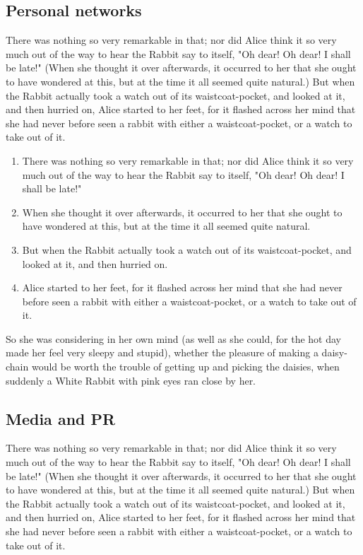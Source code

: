 \documentclass[12pt]{article}
\begin{document}
\subsection{Personal networks}
\label{sec:orgheadline27}
There was nothing so very remarkable in that; nor did Alice think it so very much out of the way to hear the Rabbit say to itself, "Oh dear! Oh dear! I shall be late!" (When she thought it over afterwards, it occurred to her that she ought to have wondered at this, but at the time it all seemed quite natural.) But when the Rabbit actually took a watch out of its waistcoat-pocket, and looked at it, and then hurried on, Alice started to her feet, for it flashed across her mind that she had never before seen a rabbit with either a waistcoat-pocket, or a watch to take out of it. 

\begin{enumerate}
\item There was nothing so very remarkable in that; nor did Alice think it so very much out of the way to hear the Rabbit say to itself, "Oh dear! Oh dear! I shall be late!"
\item When she thought it over afterwards, it occurred to her that she ought to have wondered at this, but at the time it all seemed quite natural.
\item But when the Rabbit actually took a watch out of its waistcoat-pocket, and looked at it, and then hurried on.
\item Alice started to her feet, for it flashed across her mind that she had never before seen a rabbit with either a waistcoat-pocket, or a watch to take out of it.
\end{enumerate}

So she was considering in her own mind (as well as she could, for the hot day made her feel very sleepy and stupid), whether the pleasure of making a daisy-chain would be worth the trouble of getting up and picking the daisies, when suddenly a White Rabbit with pink eyes ran close by her.

\subsection{Media and PR}
\label{sec:orgheadline28}
There was nothing so very remarkable in that; nor did Alice think it so very much out of the way to hear the Rabbit say to itself, "Oh dear! Oh dear! I shall be late!" (When she thought it over afterwards, it occurred to her that she ought to have wondered at this, but at the time it all seemed quite natural.) But when the Rabbit actually took a watch out of its waistcoat-pocket, and looked at it, and then hurried on, Alice started to her feet, for it flashed across her mind that she had never before seen a rabbit with either a waistcoat-pocket, or a watch to take out of it. 
\end{document}
